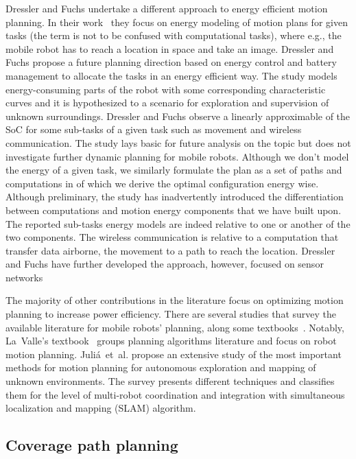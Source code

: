 Dressler and Fuchs undertake a different approach to energy efficient motion planning. In their work~\citep{dressler2005energy} they focus on energy modeling of motion plans for given tasks (the term is not to be confused with computational tasks), where e.g., the mobile robot has to reach a location in space and take an image. Dressler and Fuchs propose a future planning direction based on energy control and battery management to allocate the tasks in an energy efficient way. The study models energy-consuming parts of the robot with some corresponding characteristic curves and it is hypothesized to a scenario for exploration and supervision of unknown surroundings. Dressler and Fuchs observe a linearly approximable of the SoC for some sub-tasks of a given task such as movement and wireless communication. The study lays basic for future analysis on the topic but does not investigate further dynamic planning for mobile robots. Although we don't model the energy of a given task, we similarly formulate the plan as a set of paths and computations in  of which we derive the optimal configuration energy wise. Although preliminary, the study has inadvertently introduced the differentiation between computations and motion energy components that we have built upon. The reported sub-tasks energy models are indeed relative to one or another of the two components. The wireless communication is relative to a computation that transfer data airborne, the movement to a path to reach the location. Dressler and Fuchs have further developed the approach, however, focused on sensor networks~\citep{fuchs2006distributed,dressler2006lifetime}

The majority of other contributions in the literature focus on optimizing motion planning to increase power efficiency. There are several studies that survey the available literature for mobile robots' planning, along some textbooks~\citep{choset2005principles,lavalle2006planning}. Notably, La~Valle's textbook~\citep{lavalle2006planning} groups planning algorithms literature and focus on robot motion planning. Juli\'{a}~et~al. propose an extensive study of the most important methods for motion planning for autonomous exploration and mapping of unknown environments. The survey presents different techniques and classifies them for the level of multi-robot coordination and integration with simultaneous localization and mapping (SLAM) algorithm. 


\subsection{Coverage path planning}

